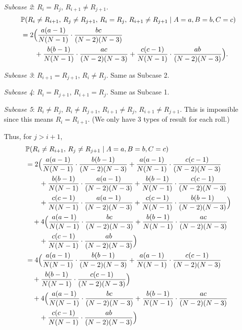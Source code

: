 \documentclass[a4paper,12pt]{article}
\begin{document}
\begin{itemize}
    \textit{Subcase 2}: $R_i = R_j$, $R_{i+1} \neq R_{j+1}$.
    \begin{align*}
        &\mathbb{P}(R_i \neq R_{i+1},\, R_j \neq R_{j+1},\, R_i = R_j,\, R_{i+1} \neq R_{j+1} \mid A=a, B=b, C=c) \\
        &= 2 \Bigl(
            \frac{a(a-1)}{N(N-1)}\cdot\frac{bc}{(N-2)(N-3)} \\
        &\qquad + \frac{b(b-1)}{N(N-1)}\cdot\frac{ac}{(N-2)(N-3)}
         + \frac{c(c-1)}{N(N-1)}\cdot\frac{ab}{(N-2)(N-3)}\Bigr).
    \end{align*}

    \textit{Subcase 3}: $R_{i+1} = R_{j+1}$, $R_i \neq R_j$. Same as Subcase 2.

    \textit{Subcase 4}: $R_i = R_{j+1}$, $R_{i+1} = R_j$. Same as Subcase 1.

    \textit{Subcase 5}: $R_i \neq R_j$, $R_i \neq R_{j+1}$, $R_{i+1} \neq R_j$, $R_{i+1} \neq R_{j+1}$. This is impossible since this means $R_i = R_{i+1}$. (We only have 3 types of result for each roll.)

    Thus, for $j > i+1$,
    \begin{align*}
        &\mathbb{P}(R_i \neq R_{i+1},\, R_j \neq R_{j+1} \mid A=a, B=b, C=c) \\
        &= 2 \Bigl(
            \frac{a(a-1)}{N(N-1)}\cdot\frac{b(b-1)}{(N-2)(N-3)}
          + \frac{a(a-1)}{N(N-1)}\cdot\frac{c(c-1)}{(N-2)(N-3)} \\
        &\qquad + \frac{b(b-1)}{N(N-1)}\cdot\frac{a(a-1)}{(N-2)(N-3)}
          + \frac{b(b-1)}{N(N-1)}\cdot\frac{c(c-1)}{(N-2)(N-3)} \\
        &\qquad + \frac{c(c-1)}{N(N-1)}\cdot\frac{a(a-1)}{(N-2)(N-3)}
          + \frac{c(c-1)}{N(N-1)}\cdot\frac{b(b-1)}{(N-2)(N-3)}\Bigr) \\
        &\quad + 4 \Bigl(
            \frac{a(a-1)}{N(N-1)}\cdot\frac{bc}{(N-2)(N-3)}
          + \frac{b(b-1)}{N(N-1)}\cdot\frac{ac}{(N-2)(N-3)} \\
        &\qquad + \frac{c(c-1)}{N(N-1)}\cdot\frac{ab}{(N-2)(N-3)}\Bigr) \\
        &= 4 \Bigl(
            \frac{a(a-1)}{N(N-1)}\cdot\frac{b(b-1)}{(N-2)(N-3)}
          + \frac{a(a-1)}{N(N-1)}\cdot\frac{c(c-1)}{(N-2)(N-3)} \\
          &\quad + \frac{b(b-1)}{N(N-1)}\cdot\frac{c(c-1)}{(N-2)(N-3)} \Bigr) \\
        &\quad + 4 \Bigl(
            \frac{a(a-1)}{N(N-1)}\cdot\frac{bc}{(N-2)(N-3)} + \frac{b(b-1)}{N(N-1)}\cdot\frac{ac}{(N-2)(N-3)} \\
        &\qquad + \frac{c(c-1)}{N(N-1)}\cdot\frac{ab}{(N-2)(N-3)}\Bigr)
    \end{align*}


\end{itemize}
\end{document}
